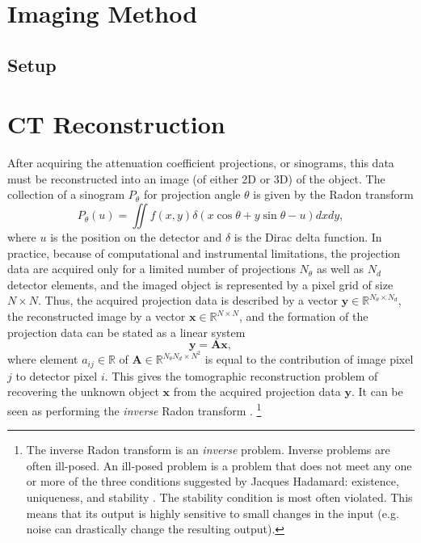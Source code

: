 \section{Imaging Method}
\subsection{Setup}

\section{CT Reconstruction}
\label{sec:ct:reconstruction}
After acquiring the attenuation coefficient projections, or sinograms, this data must be reconstructed into an image (of either 2D or 3D) of the object. The collection of a sinogram $P_\theta$ for projection angle $\theta$ is given by the Radon transform \cite{4307775,jimaging4110128}
\begin{equation}
    \label{eq:radontransform}
    P_\theta(u) = \iint f\left(x,y \right)\delta\left(x \cos \theta + y \sin \theta -u \right)dxdy,
\end{equation}
where $u$ is the position on the detector and $\delta$ is the Dirac delta function. In practice, because of computational and instrumental limitations, the projection data are acquired only for a limited number of projections $N_\theta$ as well as $N_d$ detector elements, and the imaged object is represented by a pixel grid of size $N \times N$. Thus, the acquired projection data is described by a vector $\bm{y} \in \mathbb{R}^{N_\theta \times N_d}$, the reconstructed image by a vector $\bm{x} \in \mathbb{R}^{N \times N}$, and the formation of the projection data can be stated as a linear system \cite{jimaging4110128}
\begin{equation}
    \label{eq:projectiondata}
    \bm{y} = \bm{A}\bm{x},
\end{equation}
where element $a_{ij} \in \mathbb{R}$ of $\bm{A} \in \mathbb{R}^{N_\theta N_d \times N^2}$ is equal to the contribution of image pixel $j$ to detector pixel $i$. This gives the tomographic reconstruction problem of recovering the unknown object $\bm{x}$ from the acquired projection data $\bm{y}$. It can be seen as performing the \textit{inverse} Radon transform \cite{KabanikhinIllVersed,GANrec}. \footnote{The inverse Radon transform is an \textit{inverse} problem. Inverse problems are often ill-posed. An ill-posed problem is a problem that does not meet any one or more of the three conditions suggested by Jacques Hadamard: existence, uniqueness, and stability \cite{KabanikhinIllVersed}. The stability condition is most often violated. This means that its output is highly sensitive to small changes in the input (e.g. noise can drastically change the resulting output). }


